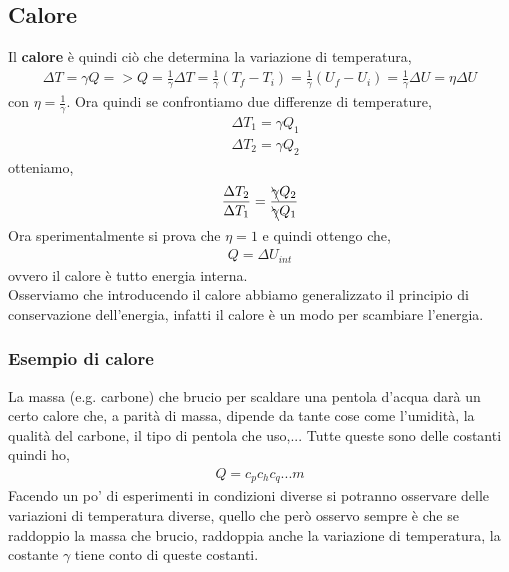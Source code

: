    \subsection{Calore}
        Il \textbf{calore} è quindi ciò che determina la variazione di temperatura,
        \begin{align*}
            \Delta T = \gamma Q => Q = \frac{1}{\gamma}\Delta T = \frac{1}{\gamma}(T_f - T_i) = \frac{1}{\gamma}(U_f - U_i) = \frac{1}{\gamma}\Delta U = \eta \Delta U
        \end{align*}
        con $\eta = \frac{1}{\gamma}$.
        Ora quindi se confrontiamo due differenze di temperature,
        \begin{align*}
            &\Delta T_1=\gamma Q_1\\
            &\Delta T_2=\gamma Q_2
        \end{align*}
        otteniamo,
        \begin{align*}
            \frac{\Delta T_2}{\Delta T_1}=\frac{\bcancel{\gamma} Q_2}{\bcancel{\gamma} Q_1}
        \end{align*}
        Ora sperimentalmente si prova che $\eta = 1$ e quindi ottengo che,
        \begin{align*}
            Q = \Delta U_{int}
        \end{align*}
        ovvero il calore è tutto energia interna.\\
        Osserviamo che introducendo il calore abbiamo generalizzato il principio di conservazione dell'energia, infatti il calore è un modo per scambiare l'energia.

        \subsubsection{Esempio di calore}
            La massa (e.g. carbone) che brucio per scaldare una pentola d'acqua darà un certo calore che, a parità di massa, dipende da tante cose come l'umidità, la qualità del carbone, il tipo di pentola che uso,... Tutte queste sono delle costanti quindi ho,
            \begin{align*}
                Q = c_p c_h c_q ... m
            \end{align*}
            Facendo un po' di esperimenti in condizioni diverse si potranno osservare delle variazioni di temperatura diverse, quello che però osservo sempre è che se raddoppio la massa che brucio, raddoppia anche la variazione di temperatura, la costante $\gamma$ tiene conto di queste costanti.


